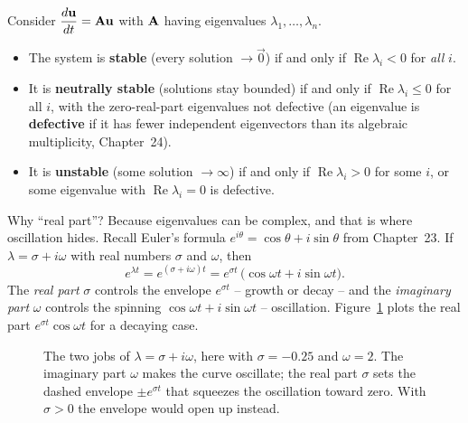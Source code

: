 \begin{formalbox}
Consider $\dfrac{d\mathbf{u}}{dt}=\mathbf{A}\mathbf{u}$ with $\mathbf{A}$ having eigenvalues
$\lambda_1,\dots,\lambda_n$.
\begin{itemize}
  \item The system is \textbf{stable} (every solution $\to\vec{0}$) if and only if
        $\operatorname{Re}\lambda_i < 0$ for \emph{all} $i$.
  \item It is \textbf{neutrally stable} (solutions stay bounded) if and only if
        $\operatorname{Re}\lambda_i \le 0$ for all $i$, with the
        zero-real-part eigenvalues not defective (an eigenvalue is \textbf{defective}
        if it has fewer independent eigenvectors than its algebraic multiplicity,
        Chapter~24).
  \item It is \textbf{unstable} (some solution $\to\infty$) if and only if
        $\operatorname{Re}\lambda_i > 0$ for some $i$, or some
        eigenvalue with $\operatorname{Re}\lambda_i = 0$ is defective.
\end{itemize}
\end{formalbox}

Why ``real part''? Because eigenvalues can be complex, and that is where
oscillation hides. Recall Euler's formula $e^{i\theta}=\cos\theta+i\sin\theta$
from Chapter~23. If $\lambda = \sigma + i\omega$ with real numbers $\sigma$ and
$\omega$, then
\[
  e^{\lambda t} = e^{(\sigma + i\omega)t}
  = e^{\sigma t}\,\bigl(\cos\omega t + i\sin\omega t\bigr).
\]
The \emph{real part} $\sigma$ controls the envelope $e^{\sigma t}$ -- growth or
decay -- and the \emph{imaginary part} $\omega$ controls the spinning
$\cos\omega t + i\sin\omega t$ -- oscillation. Figure~\ref{ch25:fig-envelope}
plots the real part $e^{\sigma t}\cos\omega t$ for a decaying case.

\begin{figure}[htbp]
\centering
{}
\caption{The two jobs of $\lambda=\sigma+i\omega$, here with $\sigma=-0.25$ and
$\omega=2$. The imaginary part $\omega$ makes the curve oscillate; the real
part $\sigma$ sets the dashed envelope $\pm e^{\sigma t}$ that squeezes the
oscillation toward zero. With $\sigma>0$ the envelope would open up instead.}
\label{ch25:fig-envelope}
\end{figure}

